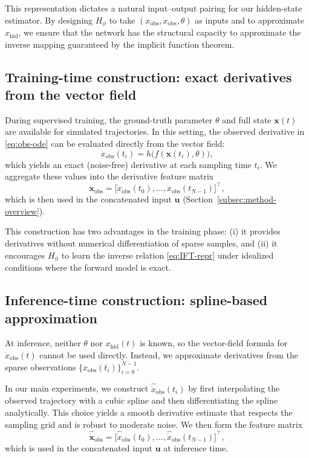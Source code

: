 This representation dictates a natural input–output pairing for our hidden-state estimator.
By designing $H_\phi$ to take $(x_{\mathrm{obs}},\dot{x}_{\mathrm{obs}},\theta)$ as inputs and to approximate $x_{\mathrm{hid}}$,
we ensure that the network has the structural capacity to approximate the inverse mapping guaranteed by the implicit function theorem.

\subsection{Training-time construction: exact derivatives from the vector field}
\label{subsec:derivative-training}

During supervised training, the ground-truth parameter $\theta$ and full state $\mathbf{x}(t)$ are available for simulated trajectories.
In this setting, the observed derivative in \eqref{eq:obs-ode} can be evaluated directly from the vector field:
\[
\dot{x}_{\mathrm{obs}}(t_i)
=
h\bigl(f(\mathbf{x}(t_i),\theta)\bigr),
\]
which yields an exact (noise-free) derivative at each sampling time $t_i$.
We aggregate these values into the derivative feature matrix
\[
\dot{\mathbf{x}}_{\mathrm{obs}}
=
\bigl[\dot{x}_{\mathrm{obs}}(t_0),\ldots,\dot{x}_{\mathrm{obs}}(t_{N-1})\bigr]^\top,
\]
which is then used in the concatenated input $\mathbf{u}$ (Section~\ref{subsec:method-overview}).

This construction has two advantages in the training phase:
(i) it provides derivatives without numerical differentiation of sparse samples, and
(ii) it encourages $H_\phi$ to learn the inverse relation \eqref{eq:IFT-repr} under idealized conditions where the forward model is exact.

\subsection{Inference-time construction: spline-based approximation}
\label{subsec:derivative-inference}

At inference, neither $\theta$ nor $x_{\mathrm{hid}}(t)$ is known, so the vector-field formula for $\dot{x}_{\mathrm{obs}}(t)$ cannot be used directly.
Instead, we approximate derivatives from the sparse observations $\{x_{\mathrm{obs}}(t_i)\}_{i=0}^{N-1}$.

In our main experiments, we construct $\widehat{\dot{x}}_{\mathrm{obs}}(t_i)$ by first interpolating the observed trajectory with a cubic spline
and then differentiating the spline analytically.
This choice yields a smooth derivative estimate that respects the sampling grid and is robust to moderate noise.
We then form the feature matrix
\[
\widehat{\dot{\mathbf{x}}}_{\mathrm{obs}}
=
\bigl[\widehat{\dot{x}}_{\mathrm{obs}}(t_0),\ldots,\widehat{\dot{x}}_{\mathrm{obs}}(t_{N-1})\bigr]^\top,
\]
which is used in the concatenated input $\mathbf{u}$ at inference time.

